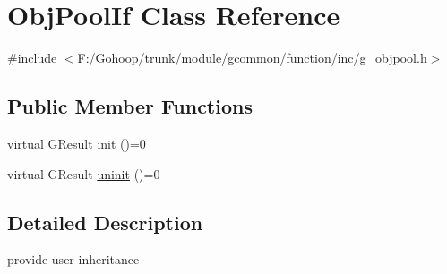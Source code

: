 \hypertarget{class_obj_pool_if}{\section{Obj\-Pool\-If Class Reference}
\label{class_obj_pool_if}
}


{\ttfamily \#include $<$F\-:/\-Gohoop/trunk/module/gcommon/function/inc/g\-\_\-objpool.\-h$>$}

\subsection*{Public Member Functions}
\begin{DoxyCompactItemize}
\item 
virtual G\-Result \hyperlink{class_obj_pool_if_a889158beb58daea8e4b245bdeb443975}{init} ()=0
\item 
virtual G\-Result \hyperlink{class_obj_pool_if_a5ea166cacebe99ed10d71440277a9243}{uninit} ()=0
\end{DoxyCompactItemize}


\subsection{Detailed Description}
provide user inheritance 

